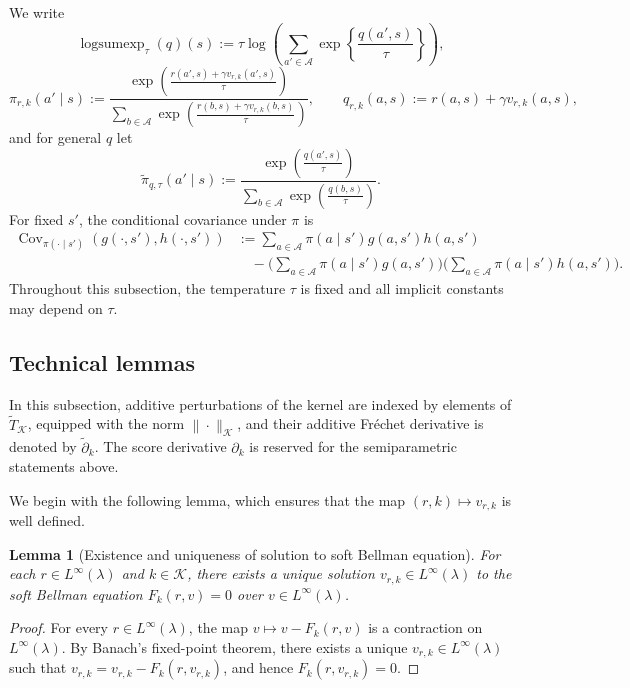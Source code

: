 \documentclass[11pt]{article}
\newcommand{\addTK}{\widetilde T_{\mathcal K}}
\newcommand{\adk}{\widetilde{\partial}_k}
\theoremstyle{plain}
\newtheorem{lemma}[theorem]{Lemma}
\begin{document}
We write
\[
\operatorname{logsumexp}_{\tau}(q)(s) := \tau \log\!\left( \sum_{a' \in \mathcal{A}} \exp\!\left\{ \frac{q(a', s)}{\tau} \right\} \right),
\]
\[
\pi_{r,k}(a'\mid s):=\frac{\exp\!\left(\frac{r(a',s)+\gamma v_{r,k}(a',s)}{\tau}\right)}{\sum_{b\in\mathcal{A}}\exp\!\left(\frac{r(b,s)+\gamma v_{r,k}(b,s)}{\tau}\right)},
\qquad
q_{r,k}(a,s):=r(a,s)+\gamma v_{r,k}(a,s),
\]
and for general $q$ let
\[
\widetilde{\pi}_{q,\tau}(a'\mid s):=\frac{\exp\!\left(\frac{q(a',s)}{\tau}\right)}{\sum_{b\in\mathcal{A}}\exp\!\left(\frac{q(b,s)}{\tau}\right)}.
\]
For fixed $s'$, the conditional covariance under $\pi$ is
\[
\begin{aligned}
\operatorname{Cov}_{\pi(\cdot\mid s')}(g(\cdot,s'),h(\cdot,s'))
&:= \sum_{a\in\mathcal{A}}\pi(a\mid s')g(a,s')h(a,s') \\
&\quad - \Big(\sum_{a\in\mathcal{A}}\pi(a\mid s')g(a,s')\Big)
\Big(\sum_{a\in\mathcal{A}}\pi(a\mid s')h(a,s')\Big).
\end{aligned}
\]
Throughout this subsection, the temperature $\tau$ is fixed and all implicit
constants may depend on $\tau$.

 



\subsection{Technical lemmas}

\label{appendix::technicalsoftmax}
 
 

In this subsection, additive perturbations of the kernel are indexed by
elements of \(\addTK\), equipped with the norm \(\|\cdot\|_{\mathcal K}\),
and their additive Fr\'echet derivative is denoted by \(\adk\). The score
derivative \(\partial_k\) is reserved for the semiparametric statements above.


 



We begin with the following lemma, which ensures that the map $(r,k) \mapsto v_{r,k}$ is well defined.


 


\begin{lemma}[Existence and uniqueness of solution to soft Bellman equation]
    For each \(r \in L^\infty(\lambda)\) and $k \in \mathcal{K}$, there exists a unique solution \(v_{r,k} \in L^\infty(\lambda)\) to the soft Bellman equation $F_{k}(r, v) = 0$ over \(v \in L^\infty(\lambda)\).
\end{lemma}
\begin{proof}
For every \(r \in L^\infty(\lambda)\), the map \(v \mapsto v - F_{k}(r,v)\) is a contraction on \(L^\infty(\lambda)\). By Banach's fixed-point theorem, there exists a unique \(v_{r,k} \in L^\infty(\lambda)\) such that \(v_{r,k} = v_{r,k} - F_{k}(r,v_{r,k})\), and hence \(F_{k}(r,v_{r,k}) = 0\).
\end{proof}
\end{document}

